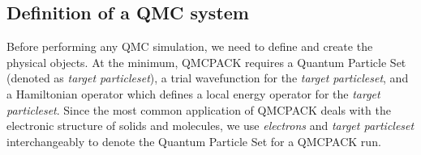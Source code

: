 \subsection{Definition of a QMC system}


Before performing any QMC simulation, we need to define and create the physical
objects. At the minimum, QMCPACK requires a Quantum Particle Set (denoted as
\emph{target particleset}), a trial wavefunction for the \emph{target
particleset}, and a Hamiltonian operator which defines a local energy operator
for the \emph{target particleset}.  Since the most common application  of
QMCPACK deals with the electronic structure of solids and molecules,  we use
\emph{electrons} and \emph{target particleset} interchangeably to denote the
Quantum Particle Set for a QMCPACK run.
 
